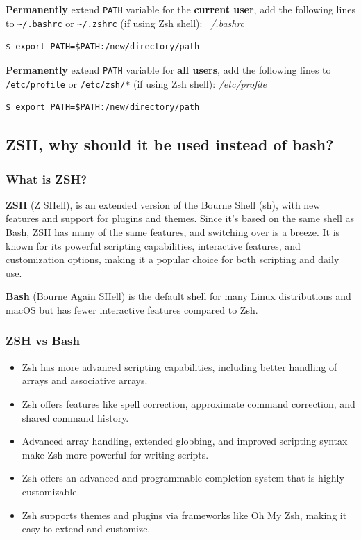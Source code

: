 \documentclass{article}
\newenvironment{codetemplate}[1][]{%
  \mybasecolorbox[#1]
  \itshape
}{%
  \endmybasecolorbox
}
\begin{document}
\textbf{Permanently} extend \verb|PATH| variable for the \textbf{current user}, add the following lines to \verb|~/.bashrc| or \verb|~/.zshrc| (if using Zsh shell):
\begin{codetemplate}{~/.bashrc}
\begin{verbatim}
$ export PATH=$PATH:/new/directory/path
\end{verbatim}
\end{codetemplate}

\textbf{Permanently} extend \verb|PATH| variable for \textbf{all users}, add the following lines to \verb|/etc/profile| or \verb|/etc/zsh/*| (if using Zsh shell):
\begin{codetemplate}{/etc/profile}
\begin{verbatim}
$ export PATH=$PATH:/new/directory/path
\end{verbatim}
\end{codetemplate}

\subsection{ZSH, why should it be used instead of bash?}

\subsubsection{What is ZSH?}
\textbf{ZSH} (Z SHell), is an extended version of the Bourne Shell (sh), with new features and support for plugins and themes. Since it's based on the same shell as Bash, ZSH has many of the same features, and switching over is a breeze.
It is known for its powerful scripting capabilities, interactive features, and customization options, making it a popular choice for both scripting and daily use.

\textbf{Bash} (Bourne Again SHell) is the default shell for many Linux distributions and macOS but has fewer interactive features compared to Zsh.

\subsubsection{ZSH vs Bash}
\begin{itemize}
    \item Zsh has more advanced scripting capabilities, including better handling of arrays and associative arrays.
    \item Zsh offers features like spell correction, approximate command correction, and shared command history.
    \item Advanced array handling, extended globbing, and improved scripting syntax make Zsh more powerful for writing scripts.
    \item Zsh offers an advanced and programmable completion system that is highly customizable.
    \item Zsh supports themes and plugins via frameworks like Oh My Zsh, making it easy to extend and customize.
\end{itemize}
\end{document}
